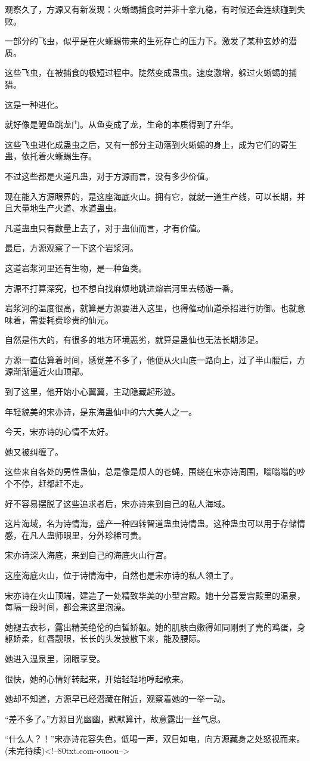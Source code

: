 \begin{this_body}
观察久了，方源又有新发现：火蜥蜴捕食时并非十拿九稳，有时候还会连续碰到失败。

一部分的飞虫，似乎是在火蜥蜴带来的生死存亡的压力下。激发了某种玄妙的潜质。

这些飞虫，在被捕食的极短过程中。陡然变成蛊虫。速度激增，躲过火蜥蜴的捕猎。

这是一种进化。

就好像是鲤鱼跳龙门。从鱼变成了龙，生命的本质得到了升华。

这些飞虫进化成蛊虫之后，又有一部分主动落到火蜥蜴的身上，成为它们的寄生蛊，依托着火蜥蜴生存。

不过这些都是火道凡蛊，对于方源而言，没有多少价值。

现在能入方源眼界的，是这座海底火山。拥有它，就就一道生产线，可以长期，并且大量地生产火道、水道蛊虫。

凡道蛊虫只有数量上去了，对于蛊仙而言，才有价值。

最后，方源观察了一下这个岩浆河。

这道岩浆河里还有生物，是一种鱼类。

方源不打算深究，也不想自找麻烦地跳进熔岩河里去畅游一番。

岩浆河的温度很高，就算是方源要进入这里，也得催动仙道杀招进行防御。也就意味着，需要耗费珍贵的仙元。

自然是伟大的，有很多的地方环境恶劣，就算是蛊仙也无法长期涉足。

方源一直估算着时间，感觉差不多了，他便从火山底一路向上，过了半山腰后，方源渐渐逼近火山顶部。

到了这里，他开始小心翼翼，主动隐藏起形迹。

年轻貌美的宋亦诗，是东海蛊仙中的六大美人之一。

今天，宋亦诗的心情不太好。

她又被纠缠了。

这些来自各处的男性蛊仙，总是像是烦人的苍蝇，围绕在宋亦诗周围，嗡嗡嗡的吵个不停，赶都赶不走。

好不容易摆脱了这些追求者后，宋亦诗来到自己的私人海域。

这片海域，名为诗情海，盛产一种四转智道蛊虫诗情蛊。这种蛊虫可以用于存储情感，在凡人蛊师眼里，分外珍稀可贵。

宋亦诗深入海底，来到自己的海底火山行宫。

这座海底火山，位于诗情海中，自然也是宋亦诗的私人领土了。

宋亦诗在火山顶端，建造了一处精致华美的小型宫殿。她十分喜爱宫殿里的温泉，每隔一段时间，都会来这里泡澡。

她褪去衣衫，露出精美绝伦的白皙娇躯。她的肌肤白嫩得如同刚剥了壳的鸡蛋，身躯娇柔，红唇靓眼，长长的头发披散下来，能及腰际。

她进入温泉里，闭眼享受。

很快，她的心情好转起来，开始轻轻地哼起歌来。

她却不知道，方源早已经潜藏在附近，观察着她的一举一动。

“差不多了。”方源目光幽幽，默默算计，故意露出一丝气息。

“什么人？！”宋亦诗花容失色，低喝一声，双目如电，向方源藏身之处怒视而来。(未完待续)<!--80txt.com-ouoou-->

\end{this_body}

